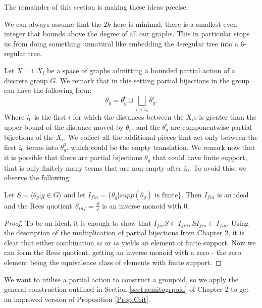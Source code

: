 The remainder of this section is making these ideas precise.
\begin{remark}
We can always assume that the $2k$ here is minimal; there is a smallest even integer that bounds above the degree of all our graphs. This in particular stops us from doing something unnatural like embedding the 4-regular tree into a 6-regular tree.
\end{remark}

Let $X= \sqcup X_{i}$ be a space of graphs admitting a bounded partial action of a discrete group $G$. We remark that in this setting partial bijections in the group can have the following form: 
\begin{equation*}
\theta_{g}=\theta_{g}^{0} \sqcup \bigsqcup_{i>i_{0}}\theta_{g}^{i}.
\end{equation*} 
Where $i_{0}$ is the first $i$ for which the distances between the $X_{i}$s is greater than the upper bound of the distance moved by $\theta_{g}$, and the $\theta_{g}^{i}$ are componentwise partial bijections of the $X_{i}$. We collect all the additional pieces that act only between the first $i_{0}$ terms into $\theta_{g}^{0}$, which could be the empty translation. We remark now that it is possible that there are partial bijections $\theta_{g}$ that could have finite support, that is only finitely many terms that are non-empty after $i_{0}$. To avoid this, we observe the following:

\begin{proposition}
Let $S = \langle \theta_{g} | g \in G \rangle$ and let $I_{fin}= \lbrace \theta_{g} | supp(\theta_{g}) \mbox{ is finite} \rbrace$. Then $I_{fin}$ is an ideal and the Rees quotient $S_{inf}=\frac{S}{I}$ is an inverse monoid with $0$.
\end{proposition}
\begin{proof}
To be an ideal, it is enough to show that $I_{fin}S \subset I_{fin}, SI_{fin}\subset I_{fin}$. Using the description of the multiplication of partial bijections from Chapter 2, it is clear that either combination $si$ or $is$ yields an element of finite support. Now we can form the Rees quotient, getting an inverse monoid with a zero - the zero element being the equivalence class of elements with finite support.
\end{proof}

We want to utilise a partial action to construct a groupoid, so we apply the general construction outlined in Section \ref{sect:semitogrpoid} of Chapter 2 to get an improved version of Proposition \ref{Prop:Crit}.

